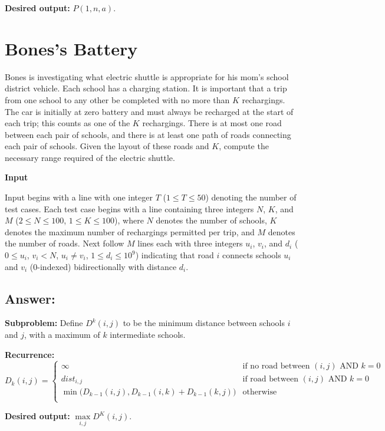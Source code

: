 \documentclass[12pt, letterpaper]{article}
\begin{document}
\vspace{5mm}
\noindent\textbf{Desired output:}
$P(1, n, a)$.

\clearpage
\section{Bones's Battery}
Bones is investigating what electric shuttle is appropriate for his mom’s school district vehicle. Each school has a charging station. It is important that a trip from one school to any other be completed with no more than $K$ rechargings. The car is initially at zero battery and must always be recharged at the start of each trip; this counts as one of the $K$ rechargings. There is at most one road between each pair of schools, and there is at least one path of roads connecting each pair of schools. Given the layout of these roads and $K$, compute the necessary range required of the electric shuttle.

\vspace{5mm}
\noindent\textbf{Input}

\noindent Input begins with a line with one integer $T$ ($1 \leq T \leq 50$) denoting the number of test cases. 
Each test case begins with a line containing three integers $N$, $K$, and $M$ ($2 \leq N \leq 100$, $1 \leq K \leq 100$), where $N$ denotes the number of schools, $K$ denotes the maximum number of rechargings permitted per trip, and $M$ denotes the number of roads. 
Next follow $M$ lines each with three integers $u_i$, $v_i$, and $d_i$ ($0 \leq u_i$, $v_i < N$, $u_i \neq v_i$, $1 \leq d_i \leq 10^9$) indicating that road $i$ connects schools $u_i$ and $v_i$ ($0$-indexed) bidirectionally with distance $d_i$.

\subsection*{Answer:}

\vspace{5mm}
\noindent\textbf{Subproblem:}
Define $D^k(i, j)$ to be the minimum distance between schools $i$ and $j$, with a maximum of $k$ intermediate schools.

\vspace{5mm}
\noindent\textbf{Recurrence:}
\begin{equation*}
    D_k(i, j) = 
    \begin{cases}
    \infty & \text{if no road between } (i, j) \text{ AND  } k = 0 \\
    {dist}_{i,j} & \text{if road between } (i, j) \text{ AND  } k = 0 \\
    \min \big( D_{k-1}(i, j), D_{k-1}(i, k) + D_{k-1}(k, j) \big) & \text{otherwise } \\
    \end{cases}
\end{equation*}

\vspace{5mm}
\noindent\textbf{Desired output:}
$\max\limits_{i, j} D^K(i, j)$.
\end{document}
